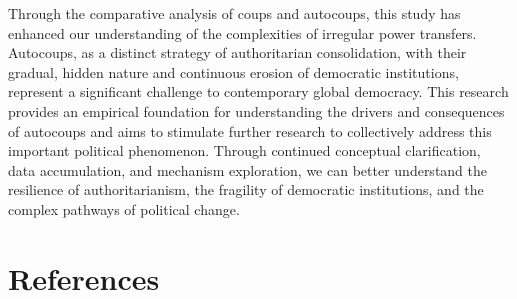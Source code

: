 \documentclass[
  12pt,
]{report}
\begin{document}
Through the comparative analysis of coups and autocoups, this study has
enhanced our understanding of the complexities of irregular power
transfers. Autocoups, as a distinct strategy of authoritarian
consolidation, with their gradual, hidden nature and continuous erosion
of democratic institutions, represent a significant challenge to
contemporary global democracy. This research provides an empirical
foundation for understanding the drivers and consequences of autocoups
and aims to stimulate further research to collectively address this
important political phenomenon. Through continued conceptual
clarification, data accumulation, and mechanism exploration, we can
better understand the resilience of authoritarianism, the fragility of
democratic institutions, and the complex pathways of political change.

\chapter*{References}\label{references}
\end{document}
